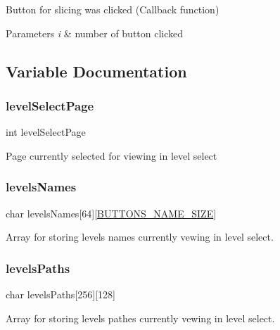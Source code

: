 Button for slicing was clicked (Callback function) 
\begin{DoxyParams}{Parameters}
{\em i} & number of button clicked \\
\hline
\end{DoxyParams}


\subsection{Variable Documentation}
\mbox{\label{group___core_ga75f52c6778fb4d3418ef0925d17fb164}} 
\subsubsection{\texorpdfstring{level\+Select\+Page}{levelSelectPage}}
{\footnotesize\ttfamily int level\+Select\+Page}

Page currently selected for viewing in level select \mbox{\label{group___core_gae5cb82a78ca4ac2c20f9d071e7124f38}} 
\subsubsection{\texorpdfstring{levels\+Names}{levelsNames}}
{\footnotesize\ttfamily char levels\+Names\mbox{[}64\mbox{]}\mbox{[}\hyperlink{group___button_ga5a86b4b0ec8a21993f74ae423ec74538}{B\+U\+T\+T\+O\+N\+S\+\_\+\+N\+A\+M\+E\+\_\+\+S\+I\+ZE}\mbox{]}}



Array for storing levels names currently vewing in level select. 

\mbox{\label{group___core_ga5a00f62db43aff74971290ceba5fa7df}} 
\subsubsection{\texorpdfstring{levels\+Paths}{levelsPaths}}
{\footnotesize\ttfamily char levels\+Paths\mbox{[}256\mbox{]}\mbox{[}128\mbox{]}}



Array for storing levels pathes currently vewing in level select. 

